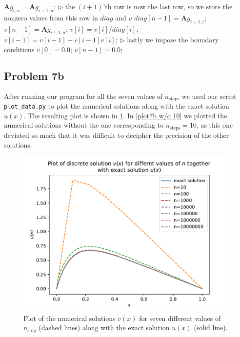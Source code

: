\documentclass[english,notitlepage]{revtex4-1}  %
\begin{document}
\begin{algorithm}[H]
\begin{algorithmic}
        \State $\textbf{A}g_{i,n} = \textbf{A}g_{i+1,n}$; 
        \EndFor
        \State
        \State $\triangleright$ the $(i+1)$'th row is now the last row, so we store the nonzero values from this row in $diag$ and $v$
        \State $diag[n-1] = \textbf{A}g_{i+1,i}$;  
        \State $v[n-1] = \textbf{A}g_{i+1,n}$; 
        \State
         
        \State $v[i] = v[i]/diag[i]$;  
        \State $v[i-1] = v[i-1] - c[i-1]v[i]$; 
        \EndFor
        \State
        \State $\triangleright$ lastly we impose the boundary conditions
        \State $v[0] = 0.0$;  
        \State $v[n-1] = 0.0$;  
        
    \end{algorithmic}
\end{algorithm}

\subsection*{Problem 7b}
After running our program for all the seven values of $n_\text{steps}$ we used our script \verb|plot_data.py| to plot the numerical solutions along with the exact solution $u(x)$. The resulting plot is shown in \cref{plot7b}. In \cref{plot7b w/o 10} we plotted the numerical solutions without the one corresponding to $n_\text{steps} = 10$, as this one deviated so much that it was difficult to decipher the precision of the other solutions.

\begin{figure}[h!]
    \centering 
    \includegraphics[scale=0.80]{../data/exactVSdiscrete.pdf} %
    \caption{Plot of the numerical solutions $v(x)$ for seven different values of $n_\text{step}$ (dashed lines) along with the exact solution $u(x)$ (solid line).}
    \label{plot7b}
\end{figure}
\end{document}
